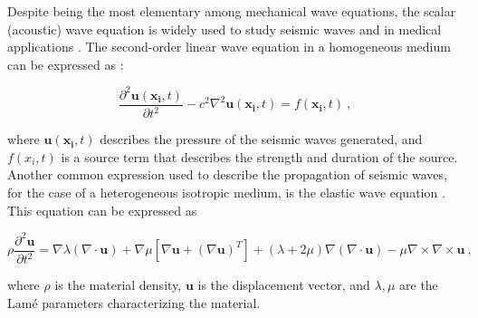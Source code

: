 \documentclass[11pt,twoside]{article}
\begin{document}



Despite being the most elementary among mechanical wave equations, the scalar (acoustic) wave equation is widely used to study seismic 
waves and in medical applications \citep{moseley_physics-informed_2022, alkhadhr_wave_2023}. The second-order linear wave equation in a 
homogeneous medium can be expressed as \citep{Carcione2002}:

\begin{equation}
\frac{\partial^2 \boldsymbol{u}(\boldsymbol{x_i}, t)}{\partial t^2} - c^{2} \nabla^2 \boldsymbol{u}(\boldsymbol{x_i}, t) =
 f(\boldsymbol{x_i}, t) \ ,
\label{acoustic}
\end{equation}

where \( \boldsymbol{u}(\boldsymbol{x_i}, t) \) describes the pressure of the seismic waves generated, and \( f(x_i, t) \) is a 
source term that describes the strength and duration of the source. Another common expression used to describe the propagation of 
seismic waves, for the case of a heterogeneous isotropic medium, is the elastic wave equation \citep{moseley_fast_2018,lehmann_fourier_2023}. 
This equation can be expressed as 

\begin{equation}
\rho \frac{\partial^2 \boldsymbol{u}}{\partial t^2} = \nabla \lambda (\nabla \cdot \boldsymbol{u}) + \nabla \mu \left[\nabla \boldsymbol{u} + (\nabla \boldsymbol{u})^T\right] + (\lambda + 2\mu) \nabla (\nabla \cdot \boldsymbol{u}) - \mu \nabla \times \nabla \times \boldsymbol{u} \ ,
\label{elastic}
\end{equation}

where $\rho$ is the material density, $\boldsymbol{u}$ is the displacement vector, and $\lambda, \mu$ are the Lamé parameters 
characterizing the material.

\end{document}
